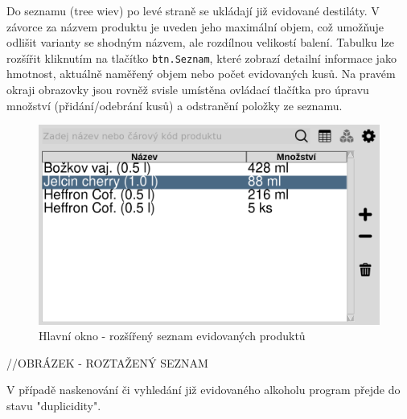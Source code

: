 
Do seznamu (tree wiev) po levé straně se ukládají již evidované destiláty. V závorce za názvem produktu je uveden jeho maximální objem, což umožňuje odlišit varianty se shodným názvem, ale rozdílnou velikostí balení. Tabulku lze rozšířit kliknutím na tlačítko \texttt{btn.Seznam}, které zobrazí detailní informace jako hmotnost, aktuálně naměřený objem nebo počet evidovaných kusů. Na pravém okraji obrazovky jsou rovněž svisle umístěna ovládací tlačítka pro úpravu množství (přidání/odebrání kusů) a odstranění položky ze seznamu.

\begin{figure}[H]
    \begin{center}
        \includegraphics[scale=0.4]{obrazky/GUI Rošířený seznam.png}
    \end{center}
    \caption{Hlavní okno - rozšířený seznam evidovaných produktů}
    \label{Hlavní okno - rozšířený seznam evidovaných produktů}
\end{figure}
//OBRÁZEK - ROZTAŽENÝ SEZNAM

V případě naskenování či vyhledání již evidovaného alkoholu program přejde do stavu "duplicidity".


